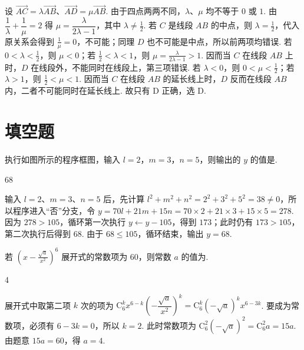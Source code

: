 \begin{solution}
设 \(\overrightarrow{AC}=\lambda\overrightarrow{AB}\)、\(\overrightarrow{AD}=\mu\overrightarrow{AB}\). 由于四点两两不同，\(\lambda\)、\(\mu\) 均不等于 \(0\) 或 \(1\). 由
\(\dfrac1\lambda+\dfrac1\mu=2\) 得
\(\mu=\dfrac{\lambda}{2\lambda-1}\)，其中 \(\lambda\ne\frac12\).
若 \(C\) 是线段 \(AB\) 的中点，则 \(\lambda=\frac12\)，代入原关系会得到 \(\frac1\mu=0\)，不可能；同理 \(D\) 也不可能是中点，所以前两项均错误.
若 \(0<\lambda<\frac12\)，则 \(\mu<0\)；若 \(\frac12<\lambda<1\)，则 \(\mu=\frac{\lambda}{2\lambda-1}>1\). 因而当 \(C\) 在线段 \(AB\) 上时，\(D\) 在线段外，不能同时在线段上，第三项错误.
若 \(\lambda<0\)，则 \(0<\mu<\frac12\)；若 \(\lambda>1\)，则 \(\frac12<\mu<1\). 因而当 \(C\) 在线段 \(AB\) 的延长线上时，\(D\) 反而在线段 \(AB\) 内，二者不可能同时在延长线上. 故只有 D 正确，选 D.
\end{solution}

\section{填空题}

\begin{problem}
执行如图所示的程序框图，输入 \(l = 2\)，\(m = 3\)，\(n = 5\)，则输出的 \(y\) 的值是\fillinblank{}.

\end{problem}

\begin{answer}
68
\end{answer}

\begin{solution}
输入 \(l=2\)、\(m=3\)、\(n=5\) 后，先计算
\(l^2+m^2+n^2=2^2+3^2+5^2=38\ne0\)，所以程序进入“否”分支，令
\(y=70l+21m+15n=70\times2+21\times3+15\times5=278\).
因为 \(278>105\)，循环第一次执行 \(y\leftarrow y-105\)，得到 \(173\)；此时仍有 \(173>105\)，第二次执行后得到 \(68\). 由于 \(68\leqslant105\)，循环结束，输出 \(y=68\).
\end{solution}

\begin{problem}
若 \(\left(x - \frac{\sqrt{a}}{x^{2}}\right)^6\) 展开式的常数项为 60，则常数 \(a\) 的值为\fillinblank{}.
\end{problem}

\begin{answer}
4
\end{answer}

\begin{solution}
展开式中取第二项 \(k\) 次的项为
\(\mathrm C_6^k x^{6-k}\left(-\dfrac{\sqrt a}{x^2}\right)^k
=\mathrm C_6^k(-\sqrt a)^k x^{6-3k}\).
要成为常数项，必须有 \(6-3k=0\)，所以 \(k=2\). 此时常数项为
\(\mathrm C_6^2(-\sqrt a)^2=\mathrm C_6^2a=15a\).
由题意 \(15a=60\)，得 \(a=4\).
\end{solution}

